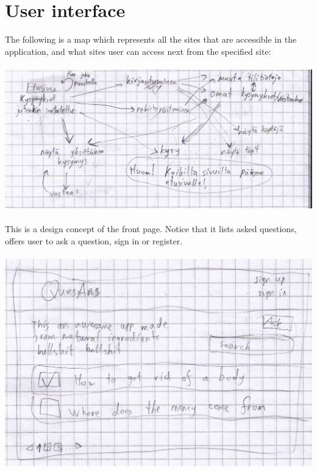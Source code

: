 \documentclass[a4paper,12pt]{article}
\begin{document}
\section{User interface}
The following is a map which represents all the sites that are accessible in the application, and what sites user can access next from the specified site:\\
\\
\includegraphics[scale=0.7]{sitemap}\\
\\
This is a design concept of the front page. Notice that it lists asked questions, offers user to ask a question, sign in or register.\\
\\
\includegraphics[scale=0.9]{FrontPage}
\end{document}

